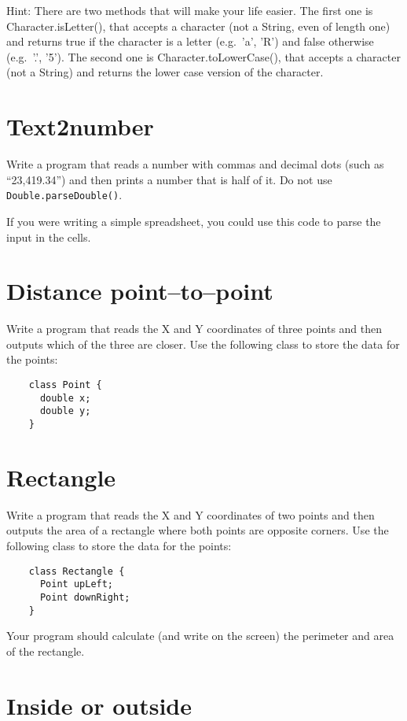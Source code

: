 \documentclass{article}
\begin{document}
Hint: There are two methods that will make your life easier. The first
one is Character.isLetter(), that accepts a character (not a String,
even of length one) and returns true if the character is a letter
(e.g.~'a', 'R') and false otherwise (e.g.~'.', '5'). The second one is
Character.toLowerCase(), that accepts a character (not a String) and
returns the lower case version of the character. 

\section{Text2number}
\label{sec:text2number}

Write a program that reads a number with commas and decimal dots (such
as ``23,419.34'') and then prints a number that is half of it. Do not
use \verb+Double.parseDouble()+. 

If you were writing a simple spreadsheet, you could use this code to
parse the input in the cells. 

\section{Distance point--to--point}
\label{sec:distance-point-point}

Write a program that reads the X and Y coordinates of three points and
then outputs which of the three are closer. Use the following class
to store the data for the points: 

\begin{verbatim}
    class Point {
      double x;
      double y;
    }
\end{verbatim}

\section{Rectangle}
\label{sec:rectangle}

Write a program that reads the X and Y coordinates of two points and
then outputs the area of a rectangle where both points are opposite
corners. Use the following class
to store the data for the points: 

\begin{verbatim}
    class Rectangle {
      Point upLeft;
      Point downRight;
    }
\end{verbatim}

Your program should calculate (and write on the screen) the perimeter
and area of the rectangle. 

\section{Inside or outside}
\label{sec:inside-or-outside}
\end{document}
